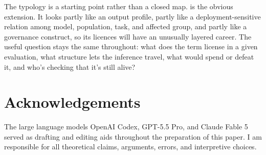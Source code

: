 \documentclass[12pt]{article}
\begin{document}
The typology is a starting point rather than a closed map.  is the
obvious extension. It looks partly like an output profile, partly like a
deployment-sensitive relation among model, population, task, and affected
group, and partly like a governance construct, so its licences will have an
unusually layered career. The useful question stays the same throughout: what
does the term license in a given evaluation, what structure lets the inference
travel, what would spend or defeat it, and who's checking that it's still
alive?

\section*{Acknowledgements}

The large language models OpenAI Codex, GPT-5.5 Pro, and Claude Fable 5 served
as drafting and editing aids throughout the preparation of this paper. I am
responsible for all theoretical claims, arguments, errors, and interpretive
choices.

\clearpage
\printbibliography
\end{document}
